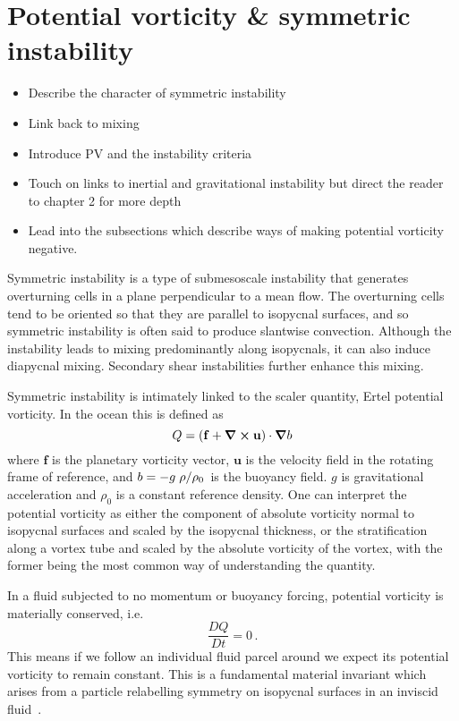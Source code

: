 \section{Potential vorticity \& symmetric instability}
\begin{itemize}
    \item Describe the character of symmetric instability
    \item Link back to mixing
    \item Introduce PV and the instability criteria
    \item Touch on links to inertial and gravitational instability but direct the reader to chapter 2 for more depth
    \item Lead into the subsections which describe ways of making potential vorticity negative.
\end{itemize}

Symmetric instability is a type of submesoscale instability that generates overturning cells in a plane perpendicular to a mean flow. The overturning cells tend to be oriented so that they are parallel to isopycnal surfaces, and so symmetric instability is often said to produce slantwise convection. Although the instability leads to mixing predominantly along isopycnals, it can also induce diapycnal mixing. Secondary shear instabilities further enhance this mixing.

Symmetric instability is intimately linked to the scaler quantity, Ertel potential vorticity. In the ocean this is defined as
\begin{equation}
    \label{eq:PVDefinition}
    Q = (\mathbf{f} + \curl{\mathbf{u}})\cdot\grad b    
\end{equation}
where $\mathbf{f}$ is the planetary vorticity vector, $\mathbf{u}$ is the velocity field in the rotating frame of reference, and $b = -  g \flatfrac{\rho}{\rho_0}$ is the buoyancy field. $g$ is gravitational acceleration and $\rho_0$ is a constant reference density. One can interpret the potential vorticity as either the component of absolute vorticity normal to isopycnal surfaces and scaled by the isopycnal thickness, or the stratification along a vortex tube and scaled by the absolute vorticity of the vortex, with the former being the most common way of understanding the quantity.

In a fluid subjected to no momentum or buoyancy forcing, potential vorticity is materially conserved, i.e.
\begin{equation}
    \frac{DQ}{Dt} = 0 \, .
\end{equation}
This means if we follow an individual fluid parcel around we expect its potential vorticity to remain constant. This is a fundamental material invariant which arises from a particle relabelling symmetry on isopycnal surfaces in an inviscid fluid~\citep{Salmon1998}.

